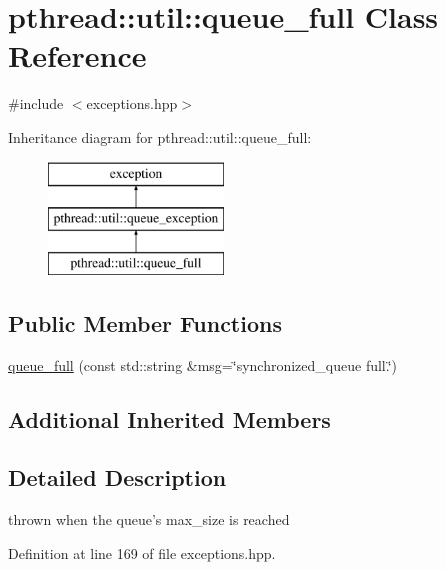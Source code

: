 \hypertarget{classpthread_1_1util_1_1queue__full}{\section{pthread\+:\+:util\+:\+:queue\+\_\+full Class Reference}
\label{classpthread_1_1util_1_1queue__full}
}


{\ttfamily \#include $<$exceptions.\+hpp$>$}

Inheritance diagram for pthread\+:\+:util\+:\+:queue\+\_\+full\+:\begin{figure}[H]
\begin{center}
\leavevmode
\includegraphics[height=3.000000cm]{classpthread_1_1util_1_1queue__full}
\end{center}
\end{figure}
\subsection*{Public Member Functions}
\begin{DoxyCompactItemize}
\item 
\hyperlink{classpthread_1_1util_1_1queue__full_a5cc7fc322cb982ba871b9c92724b20c3}{queue\+\_\+full} (const std\+::string \&msg=\char`\"{}synchronized\+\_\+queue full.\char`\"{})
\end{DoxyCompactItemize}
\subsection*{Additional Inherited Members}


\subsection{Detailed Description}
thrown when the queue's max\+\_\+size is reached 

Definition at line 169 of file exceptions.\+hpp.



